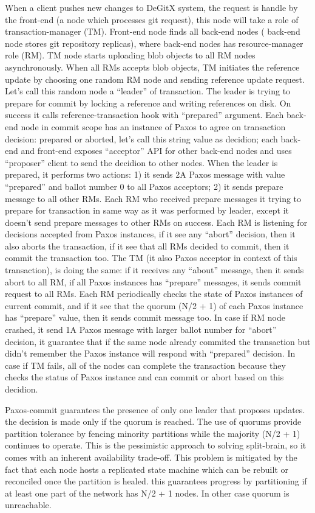 \documentclass[acmlarge, screen, nonacm]{acmart}
\begin{document}
When a client pushes new changes to DeGitX system, the request is handle by the front-end (a node which processes
git request), this node will take a role of transaction-manager (TM). Front-end node finds all back-end nodes (
back-end node stores git repository replicas), where back-end nodes has resource-manager role (RM).
TM node starts uploading blob objects to all RM nodes asynchronously. When all RMs accepts blob objects,
TM initiates the reference update by choosing one random RM node and sending reference update request.
Let's call this random node a ``leader'' of transaction. The leader is trying to prepare for commit by
locking a reference and writing references on disk. On success it calls reference-transaction hook with ``prepared''
argument. Each back-end node in commit scope has an instance of Paxos to agree on transaction decision: prepared or aborted,
let's call this string value as decidion;
each back-end and front-end exposes ``acceptor'' API for other back-end nodes and uses ``proposer'' client to send
the decidion to other nodes. When the leader is prepared, it performs two actions: 1) it sends 2A Paxos message with value
``prepared'' and ballot number 0 to all Paxos acceptors; 2) it sends prepare message to all other RMs.
Each RM who received prepare messages it trying to prepare for transaction in same way as it was performed by leader,
except it doesn't send prepare messages to other RMs on success. Each RM is listening for decisions accepted from Paxos
instances, if it see any ``abort'' decision, then it also aborts the transaction, if it see that all RMs decided to commit,
then it commit the transaction too. The TM (it also Paxos acceptor in context of this transaction), is doing the same:
if it receives any ``about'' message, then it sends abort to all RM, if all Paxos instances has ``prepare'' messages,
it sends commit request to all RMs. Each RM periodically checks the state of Paxos instances of current commit, and if it see
that the quorum (N/2 + 1) of each Paxos instance has ``prepare'' value, then it sends commit message too.
In case if RM node crashed, it send 1A Paxos message with larger ballot number for ``abort'' decision, it guarantee
that if the same node already commited the transaction but didn't remember the Paxos instance will respond with
``prepared'' decision. In case if TM fails, all of the nodes can complete the transaction because they checks the status
of Paxos instance and can commit or abort based on this decidion.

Paxos-commit guarantees the presence of only one leader that proposes updates.
the decision is made only if the quorum is reached.
The use of quorums provide partition tolerance by fencing minority partitions while the majority (N/2 + 1) continues to operate.
This is the pessimistic approach to solving split-brain,
so it comes with an inherent availability trade-off.
This problem is mitigated by the fact that each node hosts a replicated state machine which can be rebuilt or reconciled once the partition is healed.
this guarantees progress by partitioning if at least one part of the network has N/2 + 1 nodes. In other case quorum is unreachable.
\end{document}
